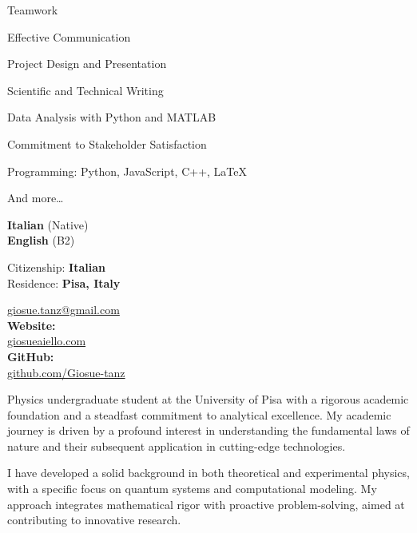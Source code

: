 \documentclass[11pt,a4paper]{article}
\begin{document}
\begin{cvlayout}


\begin{cvskills}
  \item Teamwork
  \item Effective Communication
  \item Project Design and Presentation
  \item Scientific and Technical Writing
  \item Data Analysis with Python and MATLAB
  \item Commitment to Stakeholder Satisfaction
  \item Programming: Python, JavaScript, C++, \LaTeX
  \item And more\dots
\end{cvskills}

\textbf{Italian} (Native)\\
\textbf{English} (B2)

Citizenship: \textbf{Italian}\\[2.9bp]
Residence: \textbf{Pisa, Italy}

{\small
\MVAt{} \href{mailto:giosue.tanz@gmail.com}{giosue.tanz@gmail.com}\\[6.3bp]
\textbf{Website:}\\
\href{https://giosueaiello.com}{giosueaiello.com}\\[6.3bp]
\textbf{GitHub:}\\
\href{https://github.com/Giosue-tanz}{github.com/Giosue-tanz}
}

\cvmaincolumn

\begin{cvprose}
Physics undergraduate student at the University of Pisa with a rigorous
academic foundation and a steadfast commitment to analytical excellence. My
academic journey is driven by a profound interest in understanding the
fundamental laws of nature and their subsequent application in cutting-edge
technologies.

I have developed a solid background in both theoretical and experimental
physics, with a specific focus on quantum systems and computational
modeling. My approach integrates mathematical rigor with proactive
problem-solving, aimed at contributing to innovative research.


\end{cvprose}
\end{cvlayout}
\end{document}
